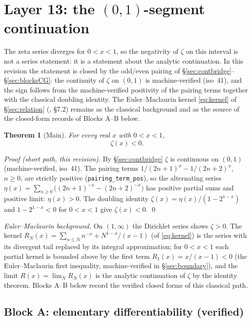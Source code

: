 \documentclass{article}
\newtheorem{theorem}{Theorem}[section]
\newcommand{\zt}{\zeta}
\begin{document}
\section{Layer 13: the $(0,1)$-segment continuation}
\label{sec:kernel}

The zeta series diverges for $0<x<1$, so the negativity of $\zt$ on this
interval is not a series statement: it is a statement about the analytic
continuation. In this revision the statement is closed by the odd/even
pairing of \S\ref{sec:contbridge}--\S\ref{sec:blocksCG}: the continuity of
$\zt$ on $(0,1)$ is machine-verified (iso~41), and the sign follows from
the machine-verified positivity of the pairing terms together with the
classical doubling identity. The Euler--Maclaurin kernel
\eqref{eq:kernel} of \S\ref{sec:relation} (\cite{whittaker}, \S7.2)
remains as the classical background and as the source of the closed-form
records of Blocks A--B below.

\begin{theorem}[Main]
\label{thm:main}
For every real $x$ with $0<x<1$,
\[
\zt(x)<0.
\]
\end{theorem}

\emph{Proof (short path, this revision).} By \S\ref{sec:contbridge} $\zt$
is continuous on $(0,1)$ (machine-verified, iso~41). The pairing terms
$1/(2n+1)^x-1/(2n+2)^x$, $n\ge 0$, are strictly positive
(\texttt{pairing\_term\_pos}), so the alternating series
$\eta(x)=\sum_{n\ge 0}\big((2n+1)^{-x}-(2n+2)^{-x}\big)$ has positive
partial sums and positive limit: $\eta(x)>0$. The doubling identity
$\zt(x)=\eta(x)/(1-2^{1-x})$ and $1-2^{1-x}<0$ for $0<x<1$ give
$\zt(x)<0$. \qed

\emph{Euler--Maclaurin background.} On $(1,\infty)$ the Dirichlet series
shows $\zt>0$. The kernel $R_N(x)=\sum_{n\le N}n^{-x}+N^{1-x}/(x-1)$ (of
\eqref{eq:kernel}) is the
series with its divergent tail replaced by its integral approximation; for
$0<x<1$ each partial kernel is bounded above by the first term
$R_1(x)=x/(x-1)<0$ (the Euler--Maclaurin first inequality, machine-verified
in \S\ref{sec:boundary}), and the limit $R(x)=\lim_N R_N(x)$ is the analytic
continuation of $\zt$ by the identity theorem. Blocks A--B below record
the verified closed forms of this classical path.

\subsection{Block A: elementary differentiability (verified)}
\label{sec:blockA}
\end{document}
